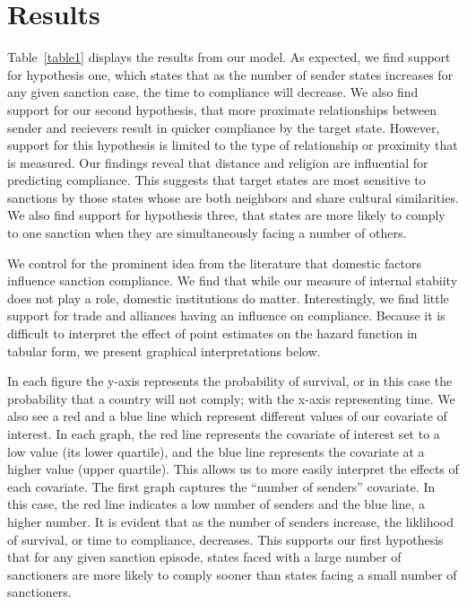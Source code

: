\section*{Results}
\label{Results} 

Table~\ref{table1} displays the results from our model. As expected, we find support for hypothesis one, which states that as the number of sender states increases for any given sanction case, the time to compliance will decrease. We also find support for our second hypothesis, that more proximate relationships between sender and recievers result in quicker compliance by the target state. However, support for this hypothesis is limited to the type of relationship or proximity that is measured. Our findings reveal that distance and religion are influential for predicting compliance. This suggests that target states are most sensitive to sanctions by those states whose are both neighbors and share cultural similarities. We also find support for hypothesis three, that states are more likely to comply to one sanction when they are simultaneously facing a number of others. 

We control for the prominent idea from the literature that domestic factors influence sanction compliance. We find that while our measure of internal stabiity does not play a role, %
domestic institutions do matter. Interestingly, we find little support for trade and alliances having an influence on compliance. 
Because it is difficult to interpret the effect of point estimates on the hazard function in tabular form, we present graphical interpretations below. 




In each figure the y-axis represents the probability of survival, or in this case the probability that a country will not comply; with the x-axis representing time. We also see a red and a blue line which represent different values of our covariate of interest. In each graph, the red line represents the covariate of interest set to a low value (its lower quartile), and the blue line represents the covariate at a higher value (upper quartile). This allows us to more easily interpret the effects of each covariate. The first graph captures the ``number of senders'' covariate. In this case, the red line indicates a low number of senders and the blue line, a higher number. It is evident that as the number of senders increase, the liklihood of survival, or time to compliance, decreases. This supports our first hypothesis that for any given sanction episode, states faced with a large number of sanctioners are more likely to comply sooner than states facing a small number of sanctioners.

